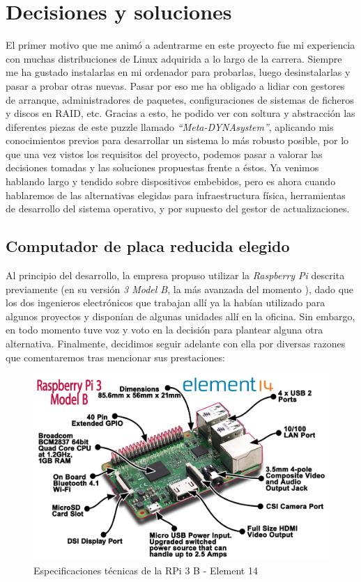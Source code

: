 \chapter{Decisiones y soluciones}

El primer motivo que me animó a adentrarme en este proyecto fue mi experiencia con muchas distribuciones de Linux adquirida a lo largo de la carrera. Siempre me ha gustado instalarlas en mi ordenador para probarlas, luego desinstalarlas y pasar a probar otras nuevas. Pasar por eso me ha obligado a lidiar con gestores de arranque, administradores de paquetes, configuraciones de sistemas de ficheros y discos en RAID, etc. Gracias a esto, he podido ver con soltura y abstracción las diferentes piezas de este puzzle llamado \textit{``Meta-DYNAsystem''}, aplicando mis conocimientos previos para desarrollar un sistema lo más robusto posible, por lo que una vez vistos los requisitos del proyecto, podemos pasar a valorar las decisiones tomadas y las soluciones propuestas frente a éstos. Ya venimos hablando largo y tendido sobre dispositivos embebidos, pero es ahora cuando hablaremos de las alternativas elegidas para infraestructura física, herramientas de desarrollo del sistema operativo, y por supuesto del gestor de actualizaciones.

\section{Computador de placa reducida elegido}

Al principio del desarrollo, la empresa propuso utilizar la \textit{Raspberry Pi} descrita previamente (en su versión \textit{3 Model B}, la más avanzada del momento \cite{raspberry-pi-3-model-b}), dado que los dos ingenieros electrónicos que trabajan allí ya la habían utilizado para algunos proyectos y disponían de algunas unidades allí en la oficina. Sin embargo, en todo momento tuve voz y voto en la decisión para plantear alguna otra alternativa. Finalmente, decidimos seguir adelante con ella por diversas razones que comentaremos tras mencionar sus prestaciones:

\begin{figure}[H]
	\centering
	\includegraphics[width=0.8\linewidth]{imagenes/Pi3+Breakout+Feb+29+2016.png}
	\caption{Especificaciones técnicas de la RPi 3 B - Element 14 \cite{raspberry-pi-3-model-b-specs}}
	\label{rpi3-b-specs}
\end{figure}

